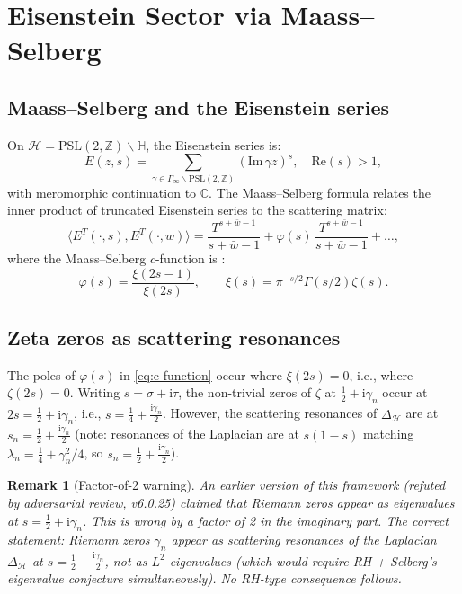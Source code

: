 \documentclass[11pt]{article}
\newtheorem{remark}[theorem]{Remark}
\newcommand{\PSL}{\mathrm{PSL}}
\newcommand{\ii}{\mathrm{i}}
\begin{document}
\section{Eisenstein Sector via Maass--Selberg}
\label{sec:Eisenstein}

\subsection{Maass--Selberg and the Eisenstein series}

On $\mathcal{H} = \PSL(2,\mathbb{Z})\backslash\mathbb{H}$, the
Eisenstein series is:
\begin{equation}
  E(z,s) = \sum_{\gamma \in \Gamma_\infty\backslash\PSL(2,\mathbb{Z})}
  (\mathrm{Im}\,\gamma z)^s, \quad \mathrm{Re}(s) > 1,
\end{equation}
with meromorphic continuation to $\mathbb{C}$. The Maass--Selberg
formula relates the inner product of truncated Eisenstein series to the
scattering matrix:
\begin{equation}
  \langle E^T(\cdot,s), E^T(\cdot,w)\rangle
  = \frac{T^{s+\bar w-1}}{s+\bar w - 1}
    + \varphi(s)\,\frac{T^{s+\bar w-1}}{s+\bar w-1}
    + \ldots,
\end{equation}
where the Maass--Selberg $c$-function is \cite{Selberg1956}:
\begin{equation}
  \varphi(s) = \frac{\xi(2s-1)}{\xi(2s)},
  \qquad \xi(s) = \pi^{-s/2}\Gamma(s/2)\zeta(s).
  \label{eq:c-function}
\end{equation}

\subsection{Zeta zeros as scattering resonances}

The poles of $\varphi(s)$ in \eqref{eq:c-function} occur where $\xi(2s) = 0$,
i.e., where $\zeta(2s) = 0$. Writing $s = \sigma + \ii\tau$, the
non-trivial zeros of $\zeta$ at $\tfrac{1}{2} + \ii\gamma_n$ occur at
$2s = \tfrac{1}{2} + \ii\gamma_n$, i.e., $s = \tfrac{1}{4} + \tfrac{\ii\gamma_n}{2}$.
However, the scattering resonances of $\Delta_{\mathcal{H}}$ are at
$s_n = \tfrac{1}{2} + \tfrac{\ii\gamma_n}{2}$ (note: resonances of the
Laplacian are at $s(1-s)$ matching $\lambda_n = \tfrac{1}{4} + \gamma_n^2/4$,
so $s_n = \tfrac{1}{2} + \tfrac{\ii\gamma_n}{2}$).

\begin{remark}[Factor-of-2 warning]
\label{rem:factor2}
An earlier version of this framework (refuted by adversarial review,
v6.0.25) claimed that Riemann zeros appear as eigenvalues at
$s = \tfrac{1}{2} + \ii\gamma_n$. This is wrong by a factor of 2 in
the imaginary part. The correct statement: Riemann zeros $\gamma_n$
appear as scattering resonances of the Laplacian $\Delta_{\mathcal{H}}$
at $s = \tfrac{1}{2} + \tfrac{\ii\gamma_n}{2}$, \emph{not} as
$L^2$ eigenvalues (which would require RH + Selberg's eigenvalue
conjecture simultaneously). No RH-type consequence follows.
\end{remark}
\end{document}
